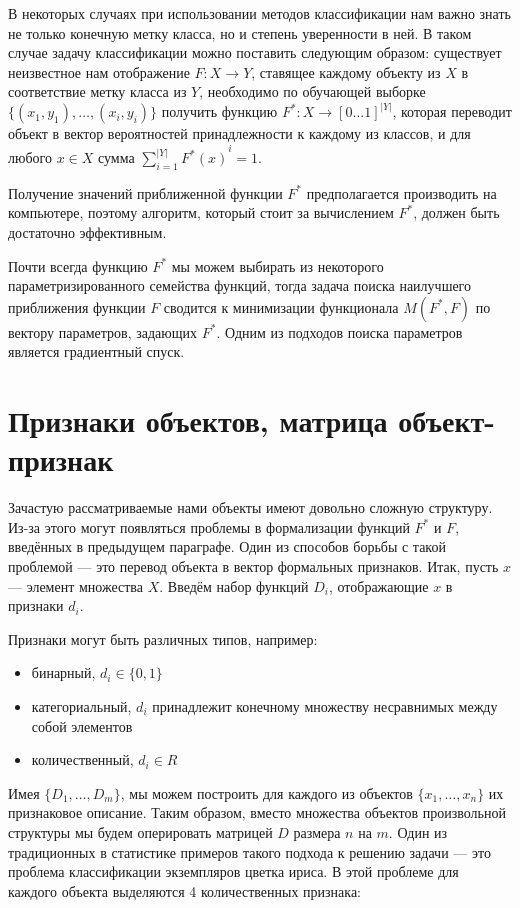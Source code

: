 В некоторых случаях при использовании методов классификации нам важно знать не только конечную метку класса, но и степень уверенности в ней. В таком случае задачу классификации можно поставить следующим образом: существует неизвестное нам отображение $F : X \to Y$, ставящее каждому объекту из $X$ в соответствие метку класса из $Y$, необходимо по обучающей выборке $\{ (x_1, y_1), \dots, (x_i, y_i) \}$ получить функцию $F^* : X \to [0 \dots 1]^{|Y|}$, которая переводит объект в вектор вероятностей принадлежности к каждому из классов, и для любого $x \in X$ сумма $\sum_{i=1}^{|Y|} {F^*(x)}^{i} = 1$.

Получение значений приближенной функции $F^*$ предполагается производить на компьютере, поэтому алгоритм, который стоит за вычислением $F^*$, должен быть достаточно эффективным. 

Почти всегда функцию $F^*$ мы можем выбирать из некоторого параметризированного семейства функций, тогда задача поиска наилучшего приближения функции $F$ сводится к минимизации функционала $M(F^*, F)$ по вектору параметров, задающих $F^*$. Одним из подходов поиска параметров является градиентный спуск.

\section{Признаки объектов, матрица объект-признак}

Зачастую рассматриваемые нами объекты имеют довольно сложную структуру. Из-за этого могут появляться проблемы в формализации функций $F^*$ и $F$, введённых в предыдущем параграфе. Один из способов борьбы с такой проблемой — это перевод объекта в вектор формальных признаков.
Итак, пусть $x$ — элемент множества $X$. Введём набор функций $D_i$, отображающие $x$ в признаки $d_i$.

Признаки могут быть различных типов, например:
\begin{itemize}
\item бинарный, $d_i \in \{0, 1\}$
\item категориальный, $d_i$ принадлежит конечному множеству несравнимых между собой элементов
\item количественный, $d_i \in R$
\end{itemize}

Имея $\{D_1,…,D_m\}$, мы можем построить для каждого из объектов $\{x_1,…,x_n\}$ их признаковое описание. Таким образом, вместо множества объектов произвольной структуры мы будем оперировать матрицей $D$ размера $n$ на $m$.
Один из традиционных в статистике примеров такого подхода к решению задачи — это проблема классификации экземпляров цветка ириса.
В этой проблеме для каждого объекта выделяются 4 количественных признака:


